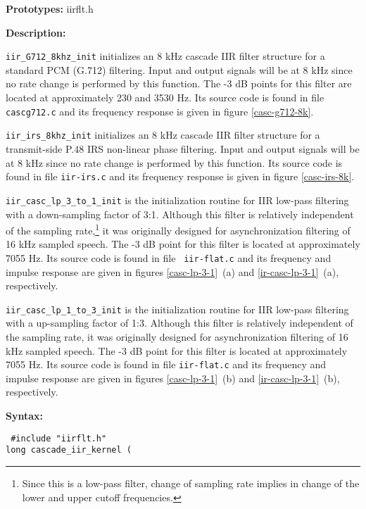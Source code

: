 {\bf Prototypes: }   iirflt.h

{\bf Description: }

{\tt iir\_G712\_8khz\_init} initializes an 8 kHz cascade IIR filter
structure for a standard PCM (G.712) filtering. Input and output
signals will be at 8 kHz since no rate change is performed by this
function. The -3 dB points for this filter are located at
approximately 230 and 3530 Hz.  Its source code is found in file {\tt
cascg712.c} and its frequency response is given in figure
\ref{casc-g712-8k}.

{\tt iir\_irs\_8khz\_init} initializes an 8 kHz cascade IIR filter
structure for a transmit-side P.48 IRS non-linear phase
filtering. Input and output signals will be at 8 kHz since no rate
change is performed by this function. Its source code is found in file
{\tt iir-irs.c} and its frequency response is given in figure
\ref{casc-irs-8k}.

{\tt iir\_casc\_lp\_3\_to\_1\_init} is the initialization routine for
IIR low-pass filtering with a down-sampling factor of 3:1. Although
this filter is relatively independent of the sampling
rate,\footnote{\SF Since this is a low-pass filter, change of sampling
rate implies in change of the lower and upper cutoff frequencies.} it
was originally designed for asynchronization filtering of 16 kHz
sampled speech. The -3 dB point for this filter is located at
approximately 7055 Hz. Its source code is found in file {\tt
iir-flat.c} and its frequency and impulse response are given in figures
\ref{casc-lp-3-1}~(a) and \ref{ir-casc-lp-3-1}~(a), respectively.

{\tt iir\_casc\_lp\_1\_to\_3\_init} is the initialization routine for
IIR low-pass filtering with a up-sampling factor of 1:3. Although this
filter is relatively independent of the sampling rate, it was
originally designed for asynchronization filtering of 16 kHz sampled
speech. The -3 dB point for this filter is located at approximately
7055 Hz. Its source code is found in file {\tt iir-flat.c} and its
frequency and impulse response are given in figures
\ref{casc-lp-3-1}~(b) and \ref{ir-casc-lp-3-1}~(b), respectively.


\newpage


{\bf Syntax: }

{\tt
\#include "iirflt.h"\\
long cascade\_iir\_kernel (
}

